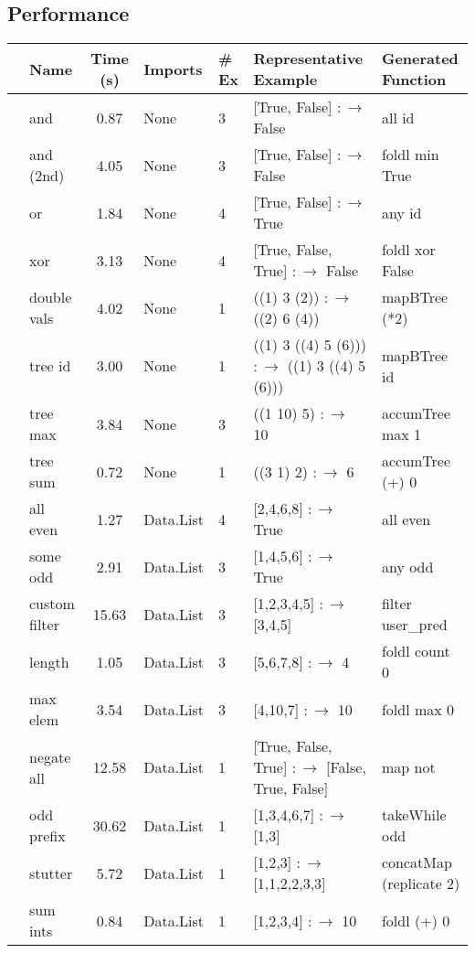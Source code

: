 \subsection{Performance}

\begin{table*}[t]
  \centering
  \bgroup
  \def\arraystretch{1.1}
  \begin{tabular}{|c|l|c|l|l|l|l|}
    \hline
    & Name & Time (s) & Imports & \# Ex & Representative Example & Generated Function \\
    \hline
    \parbox[t]{2mm}{}
    & and & 0.87 & None & 3 & [True, False] $:\to$ False & all id \\
    & and (2nd) & 4.05 & None & 3 & [True, False] $:\to$ False & foldl min True \\
    & or  & 1.84 & None & 4 & [True, False] $:\to$ True & any id \\
    & xor & 3.13 & None & 4 & [True, False, True] $:\to$ False & foldl xor False \\
    \hline

    \parbox[t]{2mm}{}
    & double vals & 4.02 & None & 1 & ((1) 3 (2)) $:\to$ ((2) 6 (4)) & mapBTree (*2) \\
    & tree id & 3.00 & None & 1 & ((1) 3 ((4) 5 (6))) $:\to$ ((1) 3 ((4) 5 (6))) & mapBTree id \\
    & tree max & 3.84 & None & 3 & ((1 10) 5) $:\to$ 10 & accumTree max 1 \\
    & tree sum & 0.72 & None & 1 & ((3 1) 2) $:\to$ 6 & accumTree (+) 0 \\
    \hline

    \parbox[t]{2mm}{}
    & all even & 1.27 & Data.List & 4 & [2,4,6,8] $:\to$ True & all even \\
    & some odd & 2.91 & Data.List & 3 & [1,4,5,6] $:\to$ True & any odd \\
    & custom filter & 15.63 & Data.List & 3 & [1,2,3,4,5] $:\to$ [3,4,5] & filter user\_pred \\
    & length & 1.05 & Data.List & 3 & [5,6,7,8] $:\to$ 4 & foldl count 0 \\
    & max elem & 3.54 & Data.List & 3 & [4,10,7] $:\to$ 10 & foldl max 0 \\
    & negate all & 12.58 & Data.List & 1 & [True, False, True] $:\to$ [False, True, False] & map not \\
    & odd prefix & 30.62 & Data.List & 1 & [1,3,4,6,7] $:\to$ [1,3] & takeWhile odd \\
    & stutter & 5.72 & Data.List & 1 & [1,2,3] $:\to$ [1,1,2,2,3,3] & concatMap (replicate 2) \\
    & sum ints & 0.84 & Data.List & 1 & [1,2,3,4] $:\to$ 10 & foldl (+) 0 \\
    \hline


\end{tabular}
\end{table*}

